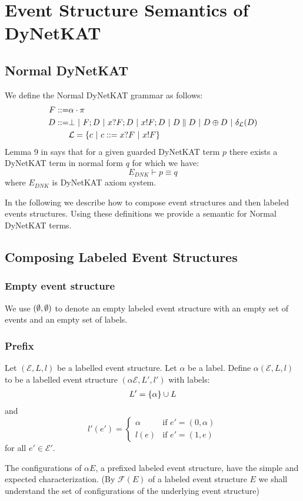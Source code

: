 \section{Event Structure Semantics of DyNetKAT}
\subsection{Normal DyNetKAT}
We define the Normal DyNetKAT grammar as follows:
\begin{align*}
    F ::= & \alpha\cdot\pi                                                                           \\
    D ::= & \bot ~|~ F;D ~|~ x?F;D ~|~ x!F;D ~|~ D \parallel D ~|~ D \oplus D ~|~ \delta_{\mathcal{L}}(D) \\
          & \mathcal{L} = \{c ~|~ c ::= x?F ~|~ x!F\}
\end{align*}
Lemma 9 in \cite{dynetkat} says that for a given guarded DyNetKAT term
$p$ there exists a DyNetKAT term in normal form $q$ for which we have:
\begin{equation*}
    E_{DNK} \vdash p \equiv q
\end{equation*}
where $E_{DNK}$ is DyNetKAT axiom system.

In the following we describe how to compose event structures and
then labeled events structures.
Using these definitions we provide a semantic for Normal DyNetKAT
terms.

\subsection{Composing Labeled Event Structures \cite{es}}

\subsubsection{Empty event structure}
We use $(\emptyset,\emptyset)$ to denote an empty labeled event structure with
an empty set of events and an empty set of labels.


\subsubsection{Prefix}

\begin{definition}
    Let $(\mathcal{E},L,l)$ be a labelled event structure.
    Let $\alpha$ be a label.
    Define $\alpha(\mathcal{E},L,l)$ to be a labelled event structure $(\alpha \mathcal{E},L',l')$
    with labels:
    \begin{align*}
        L' = \{\alpha\} \cup L
    \end{align*}
    and
    $$
        l'(e') = \begin{cases}
            \alpha & \text{if } e' = (0,\alpha) \\
            l(e)   & \text{if } e' = (1,e)
        \end{cases}
    $$
    for all $e' \in \mathcal{E'}$.
\end{definition}
The configurations of $\alpha E$, a prefixed labeled event structure,
have the simple and expected characterization.
(By $\mathcal{F}(E)$ of a labeled event structure $E$ we shall understand the set
of configurations of the underlying event structure)

